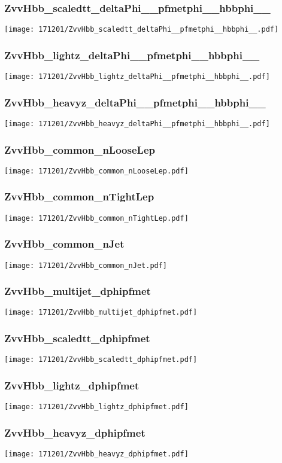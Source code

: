 \begin{frame}
   \frametitle{\small ZvvHbb\_scaledtt\_deltaPhi\_\_pfmetphi\_\_hbbphi\_\_}
   \centering
   \texttt{[image: 171201/ZvvHbb\_scaledtt\_deltaPhi\_\_pfmetphi\_\_hbbphi\_\_.pdf]}
\end{frame}

\begin{frame}
   \frametitle{\small ZvvHbb\_lightz\_deltaPhi\_\_pfmetphi\_\_hbbphi\_\_}
   \centering
   \texttt{[image: 171201/ZvvHbb\_lightz\_deltaPhi\_\_pfmetphi\_\_hbbphi\_\_.pdf]}
\end{frame}

\begin{frame}
   \frametitle{\small ZvvHbb\_heavyz\_deltaPhi\_\_pfmetphi\_\_hbbphi\_\_}
   \centering
   \texttt{[image: 171201/ZvvHbb\_heavyz\_deltaPhi\_\_pfmetphi\_\_hbbphi\_\_.pdf]}
\end{frame}

\begin{frame}
   \frametitle{\small ZvvHbb\_common\_nLooseLep}
   \centering
   \texttt{[image: 171201/ZvvHbb\_common\_nLooseLep.pdf]}
\end{frame}

\begin{frame}
   \frametitle{\small ZvvHbb\_common\_nTightLep}
   \centering
   \texttt{[image: 171201/ZvvHbb\_common\_nTightLep.pdf]}
\end{frame}

\begin{frame}
   \frametitle{\small ZvvHbb\_common\_nJet}
   \centering
   \texttt{[image: 171201/ZvvHbb\_common\_nJet.pdf]}
\end{frame}

\begin{frame}
   \frametitle{\small ZvvHbb\_multijet\_dphipfmet}
   \centering
   \texttt{[image: 171201/ZvvHbb\_multijet\_dphipfmet.pdf]}
\end{frame}

\begin{frame}
   \frametitle{\small ZvvHbb\_scaledtt\_dphipfmet}
   \centering
   \texttt{[image: 171201/ZvvHbb\_scaledtt\_dphipfmet.pdf]}
\end{frame}

\begin{frame}
   \frametitle{\small ZvvHbb\_lightz\_dphipfmet}
   \centering
   \texttt{[image: 171201/ZvvHbb\_lightz\_dphipfmet.pdf]}
\end{frame}

\begin{frame}
   \frametitle{\small ZvvHbb\_heavyz\_dphipfmet}
   \centering
   \texttt{[image: 171201/ZvvHbb\_heavyz\_dphipfmet.pdf]}
\end{frame}

